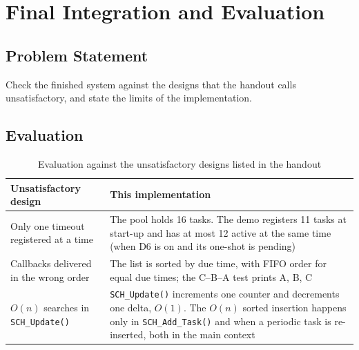 \documentclass[twoside,final]{hcmut-report}
\begin{document}
\section{Final Integration and Evaluation}
\subsection{Problem Statement}
Check the finished system against the designs that the handout calls unsatisfactory, and state the limits of the implementation.

\subsection{Evaluation}
\begin{table}[H]
    \centering
    \caption{Evaluation against the unsatisfactory designs listed in the handout}
    \label{tab:criteria}
    \begin{tabular}{p{}p{}}
        \toprule
        \textbf{Unsatisfactory design} & \textbf{This implementation} \\
        \midrule
        Only one timeout registered at a time & The pool holds 16 tasks. The demo registers 11 tasks at start-up and has at most 12 active at the same time (when D6 is on and its one-shot is pending) \\
        Callbacks delivered in the wrong order & The list is sorted by due time, with FIFO order for equal due times; the C--B--A test prints A, B, C \\
        $O(n)$ searches in \texttt{SCH\_Update()} & \texttt{SCH\_Update()} increments one counter and decrements one delta, $O(1)$. The $O(n)$ sorted insertion happens only in \texttt{SCH\_Add\_Task()} and when a periodic task is re-inserted, both in the main context \\
        \bottomrule
    \end{tabular}
\end{table}
\end{document}
